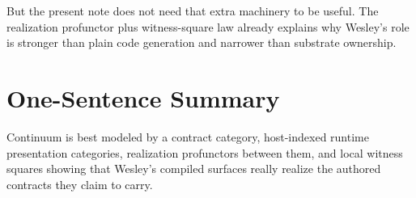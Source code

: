\documentclass[11pt]{article}
\theoremstyle{definition}
\begin{document}
But the present note does not need that extra machinery to be useful. The
realization profunctor plus witness-square law already explains why Wesley's
role is stronger than plain code generation and narrower than substrate
ownership.

\section{One-Sentence Summary}

Continuum is best modeled by a contract category, host-indexed runtime
presentation categories, realization profunctors between them, and local
witness squares showing that Wesley's compiled surfaces really realize the
authored contracts they claim to carry.
\end{document}
